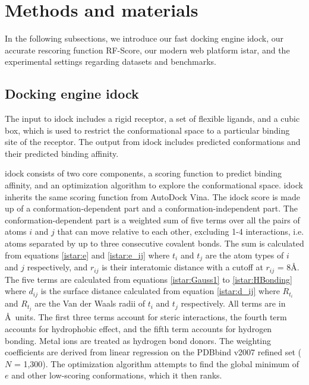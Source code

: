 \section{Methods and materials}

In the following subsections, we introduce our fast docking engine idock, our accurate rescoring function RF-Score, our modern web platform istar, and the experimental settings regarding datasets and benchmarks.

\subsection{Docking engine idock}

The input to idock includes a rigid receptor, a set of flexible ligands, and a cubic box, which is used to restrict the conformational space to a particular binding site of the receptor. The output from idock includes predicted conformations and their predicted binding affinity.

idock consists of two core components, a scoring function to predict binding affinity, and an optimization algorithm to explore the conformational space. idock inherits the same scoring function from AutoDock Vina. The idock score is made up of a conformation-dependent part and a conformation-independent part. The conformation-dependent part is a weighted sum of five terms over all the pairs of atoms $i$ and $j$ that can move relative to each other, excluding 1-4 interactions, i.e. atoms separated by up to three consecutive covalent bonds. The sum is calculated from equations \eqref{istar:e} and \eqref{istar:e_ij} where $t_i$ and $t_j$ are the atom types of $i$ and $j$ respectively, and $r_{ij}$ is their interatomic distance with a cutoff at $r_{ij}$ = 8\AA. The five terms are calculated from equations \eqref{istar:Gauss1} to \eqref{istar:HBonding} where $d_{ij}$ is the surface distance calculated from equation \eqref{istar:d_ij} where $R_{t_i}$ and $R_{t_j}$ are the Van der Waals radii of $t_i$ and $t_j$ respectively. All terms are in \AA\ units. The first three terms account for steric interactions, the fourth term accounts for hydrophobic effect, and the fifth term accounts for hydrogen bonding. Metal ions are treated as hydrogen bond donors. The weighting coefficients are derived from linear regression on the PDBbind \citep{529,530,1633} v2007 refined set ($N$ = 1,300). The optimization algorithm attempts to find the global minimum of $e$ and other low-scoring conformations, which it then ranks.


